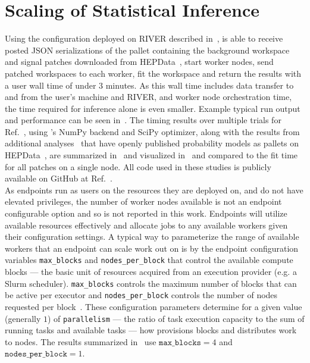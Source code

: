 \section{Scaling of Statistical Inference}\label{sec:results}
%
Using the \funcX{} configuration deployed on RIVER described in~, \funcX{} is able to receive posted JSON serializations of the \pyhf{} pallet containing the background workspace and signal patches downloaded from HEPData~\cite{ATLAS_SUSY_1Lbb_pallet}, start \funcX{} worker nodes, send patched workspaces to each worker, fit the workspace and return the results with a user wall time of under 3 minutes.
As this wall time includes data transfer to and from the user's machine and RIVER, and worker node orchestration time, the time required for inference alone is even smaller.
Example typical run output and performance can be seen in~.
The timing results over multiple trials for Ref.~\cite{ATLAS_SUSY_1Lbb_pallet}, using \pyhf{}'s NumPy backend and SciPy optimizer, along with the results from additional analyses~\cite{SUSY-2018-09,SUSY-2018-04} that have openly published probability models as \pyhf{} pallets on HEPData~\cite{ATLAS_SUSY_SS3L_pallet,ATLAS_SUSY_staus_pallet}, are summarized in~ and visualized in~ and compared to the fit time for all patches on a single node.
All code used in these studies is publicly available on GitHub at Ref.~\cite{study_code,study_code_zenodo_doi}.\\

As \funcX{} endpoints run as users on the resources they are deployed on, and do not have elevated privileges, the number of worker nodes available is not an endpoint configurable option and so is not reported in this work.
Endpoints will utilize available resources effectively and allocate jobs to any available workers given their configuration settings.
A typical way to parameterize the range of available workers that an endpoint can scale work out on is by the \funcX{} endpoint configuration variables \texttt{max\_blocks} and \texttt{nodes\_per\_block} that control the available compute blocks --- the basic unit of resources acquired from an execution provider (e.g. a Slurm scheduler).
\texttt{max\_blocks} controls the maximum number of blocks that can be active per \funcX{} executor and \texttt{nodes\_per\_block} controls the number of nodes requested per block~\cite{Parsl_paper}.
These configuration parameters determine for a given value (generally $1$) of \texttt{parallelism} --- the ratio of task execution capacity to the sum of running tasks and available tasks --- how \funcX{} provisions blocks and distributes work to nodes.
The results summarized in~ use $\texttt{max\_blocks}=4$ and $\texttt{nodes\_per\_block}=1$.
\clearpage


